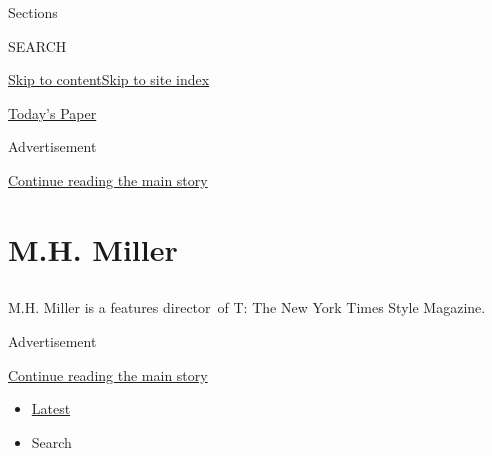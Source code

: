 Sections

SEARCH

\protect\hyperlink{site-content}{Skip to
content}\protect\hyperlink{site-index}{Skip to site index}

\href{https://myaccount.nytimes.com/auth/login?response_type=cookie\&client_id=vi}{}

\href{https://www.nytimes.com/section/todayspaper}{Today's Paper}

Advertisement

\protect\hyperlink{after-top}{Continue reading the main story}

\hypertarget{mh-miller}{%
\section{M.H. Miller}\label{mh-miller}}

\hypertarget{section}{%
\subsection{}\label{section}}

M.H. Miller is a features director~of T: The New York Times Style
Magazine.

Advertisement

\protect\hyperlink{after-mid1}{Continue reading the main story}

\begin{itemize}
\tightlist
\item
  \protect\hyperlink{stream-panel}{Latest}
\item
  Search
\end{itemize}

